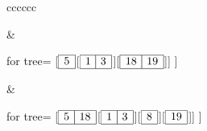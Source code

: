 \documentclass{article}
\begin{document}
\begin{table}[htp]
\begin{tabular}{cccccc}
\begin{minipage}[t]{2.5cm}
\begin{forest}
\begin{array}{|c|c|}
         \;\big\vert{} \\
        \hline
      \end{array} $]]
            ] 
        \end{forest}
    \end{minipage} &\begin{minipage}[t]{3.5cm}
        \vfill
        \begin{forest} for tree={}
            [$\begin{array}{|c|}
         \\
        \hline
      \end{array} $[$\begin{array}{|c|}
        \;\big\vert{} \\
        \hline
      \end{array} $][$\begin{array}{|c|c|}
         \;\big\vert{} \\
        \hline
      \end{array} $]]
            ] 
        \end{forest}
    \end{minipage} &\begin{minipage}[t]{4cm}
        \vfill
        \begin{forest} for tree={}
            [$\begin{array}{|c|}
        \;\big\vert{} \\
        \hline
      \end{array} $[$\begin{array}{|c|}
        \;\big\vert{} \\
        \hline
      \end{array} $][$\begin{array}{|c|c|}
         \\
        \hline
      \end{array} $][$\begin{array}{|c|c|}
         \\
        \hline
      \end{array} $]]
            ] 
        \end{forest}
    \end{minipage} 
    \end{tabular}


\end{table}
\end{document}
